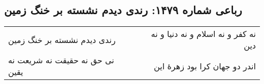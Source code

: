 \begin{center}
\section*{رباعی شماره ۱۴۷۹: رندی دیدم نشسته بر خنگ زمین}
\label{sec:1479}
\begin{longtable}{l p{0.5cm} r}
رندی دیدم نشسته بر خنگ زمین
&&
نه کفر و نه اسلام و نه دنیا و نه دین
\\
نی حق نه حقیقت نه شریعت نه یقین
&&
اندر دو جهان کرا بود زهرهٔ این
\\
\end{longtable}
\end{center}
